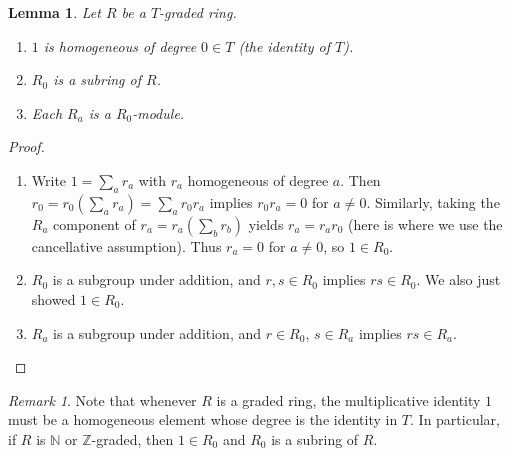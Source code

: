 \documentclass{amsart}[12pt]
\newcommand{\ZZ}{\mathbb{Z}}
\newcommand{\NN}{\mathbb{N}}
\numberwithin{equation}{section}
\theoremstyle{plain} %
\newtheorem{lem}[equation]{Lemma}
\theoremstyle{definition}
\theoremstyle{remark}
\newtheorem{remark}[equation]{Remark}
\begin{document}
\begin{lem} Let $R$ be a $T$-graded ring. 
\begin{enumerate}
\item $1$ is homogeneous of degree $0\in T$ (the identity of $T$).
\item $R_0$ is a subring of $R$.
\item Each $R_a$ is a $R_0$-module.
\end{enumerate}
\end{lem}
\begin{proof}
\begin{enumerate}
\item Write $1=\sum_a r_a$ with $r_a$ homogeneous of degree $a$. Then $r_0 = r_0 (\sum_a r_a) = \sum_a r_0 r_a$ implies $r_0 r_a = 0$ for $a\neq 0$. Similarly, taking the $R_a$ component of $r_a = r_a (\sum_b r_b)$ yields $r_a = r_a r_0$ (here is where we use the cancellative assumption). Thus $r_a =0$ for $a\neq 0$, so $1\in R_0$.
\item $R_0$ is a subgroup under addition, and $r,s\in R_0$ implies $rs\in R_0$. We also just showed $1\in R_0$.
\item $R_a$ is a subgroup under addition, and $r\in R_0$, $s\in R_a$ implies $rs\in R_a$.
\end{enumerate}
\end{proof}

\begin{remark}
Note that whenever $R$ is a graded ring, the multiplicative identity $1$ must be a homogeneous element whose degree is the identity in $T$. In particular, if $R$ is $\NN$ or $\ZZ$-graded, then $1 \in R_0$ and $R_0$ is a subring of $R$.
\end{remark}
\end{document}
